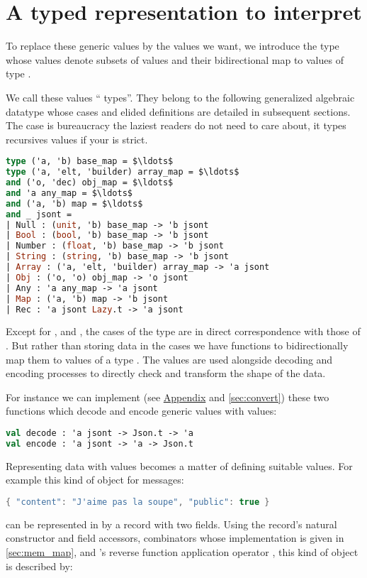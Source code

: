 \documentclass[nolinenum]{jfp}
\begin{document}
\section{A typed representation to interpret}
\label{sec:jsont}

To replace these generic values by the \ml{} values we want, we
introduce the type  whose values denote subsets of
\json{} values and their bidirectional map to \ml{} values of type
.

We call these values ``\json{} types''. They belong to the following
generalized algebraic datatype whose cases and elided definitions are
detailed in subsequent sections. The  case is bureaucracy
the laziest readers do not need to care about, it types recursives
\json{} values if your \ml{} is strict.

\begin{lstlisting}[language=ocaml]
type ('a, 'b) base_map = $\ldots$
type ('a, 'elt, 'builder) array_map = $\ldots$
and ('o, 'dec) obj_map = $\ldots$
and 'a any_map = $\ldots$
and ('a, 'b) map = $\ldots$
and _ jsont =
| Null : (unit, 'b) base_map -> 'b jsont
| Bool : (bool, 'b) base_map -> 'b jsont
| Number : (float, 'b) base_map -> 'b jsont
| String : (string, 'b) base_map -> 'b jsont
| Array : ('a, 'elt, 'builder) array_map -> 'a jsont
| Obj : ('o, 'o) obj_map -> 'o jsont
| Any : 'a any_map -> 'a jsont
| Map : ('a, 'b) map -> 'b jsont
| Rec : 'a jsont Lazy.t -> 'a jsont
\end{lstlisting}
%
Except for ,  and , the cases of the type
 are in direct correspondence with those of
. But rather than storing data in the cases we have
functions to bidirectionally map them to values of a type
. The  values are used alongside decoding and
encoding processes to directly check and transform the shape of the
data.

For instance we can implement (see \hyperref[sec:appendix]{Appendix}
and \autoref{sec:convert}) these two functions which decode and encode
generic  values with \ml{} values:
\begin{lstlisting}[language=ocaml]
val decode : 'a jsont -> Json.t -> 'a
val encode : 'a jsont -> 'a -> Json.t
\end{lstlisting}

Representing \json{} data with \ml{} values becomes a matter of
defining suitable  values. For example this
kind of \json{} object for messages:
%
\begin{lstlisting}[language=c]
{ "content": "J'aime pas la soupe", "public": true }
\end{lstlisting}
%
can be represented in \ml{} by a record with two fields. Using the
record's natural constructor and field accessors, combinators whose
implementation is given in \autoref{sec:mem_map}, and \ocaml's reverse
function application operator \code{|>}, this kind of object is described by:
\end{document}
